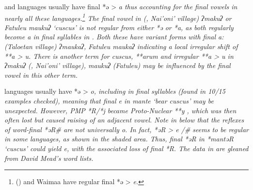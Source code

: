 and  languages usually have final *ə > \it{a}
thus accounting for the final vowels in nearly all these languages.\footnote{
() and Waima{\Q}a have regular final *ə > \it{e}.}
The final vowel
in  (, Nai'oni' village) \it{ʔmakuʔ} or Fatule{\Q}u \it{maukuʔ} ‘cuscus’
is not regular from either *ə or *a,
as both regularly become \it{a} in final syllables in  \citep[55f, 73]{Edwards2021}.
Both these have variant forms with final \it{a:}  (Taloetan
village) \it{ʔmaukaʔ,} Fatule{\Q}u \it{maukaʔ} indicating a local
irregular shift of **a \it{> u}.
There is another  term for cuscus,
**arum \citep[91f]{Edwards2021} and irregular **a > \it{u}
in \it{ʔmakuʔ} (, Nai'oni' village), \it{maukuʔ} (Fatule{\Q}u) may be influenced
by the final vowel in this other term.

 languages usually have *ə > \it{o},
including in final syllables (found in 10/15 examples checked),
meaning that final \it{e} in \it{mante} ‘bear cuscus’ may be unexpected.
However, PMP *R/*j became Proto-Nuclear  **y
\citep[91]{vandenBerg2003},
which was then often lost but caused raising of an adjacent vowel.
Note in  below that the reflexes of word-final *əR{\#} are not universally \it{o}.
In fact, *əR > \it{e} /{\gap}{\#} seems to be regular in some languages,
as shown in the shaded area.
Thus, final *əR in *mantəR ‘cuscus’ could yield \it{e},
with the associated loss of final *R.
The data in  are gleaned from David Mead’s word lists.

